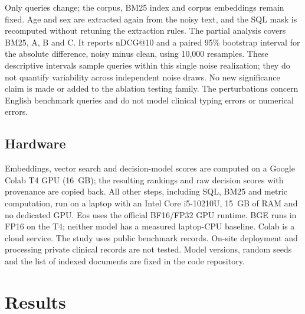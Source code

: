 \documentclass{article}
\begin{document}
Only queries change; the corpus, BM25 index and corpus embeddings remain fixed. Age and sex are extracted again from the noisy text, and the SQL mask is recomputed without retuning the extraction rules. The partial analysis covers BM25, A, B and C. It reports nDCG@10 and a paired 95\% bootstrap interval for the absolute difference, noisy minus clean, using 10{,}000 resamples. These descriptive intervals sample queries within this single noise realization; they do not quantify variability across independent noise draws. No new significance claim is made or added to the ablation testing family. The perturbations concern English benchmark queries and do not model clinical typing errors or numerical errors.

\subsection{Hardware}

Embeddings, vector search and decision-model scores are computed on a Google Colab T4 GPU (16~GB); the resulting rankings and raw decision scores with provenance are copied back. All other steps, including SQL, BM25 and metric computation, run on a laptop with an Intel Core i5-10210U, 15~GB of RAM and no dedicated GPU. Eos uses the official BF16/FP32 GPU runtime. BGE runs in FP16 on the T4; neither model has a measured laptop-CPU baseline. Colab is a cloud service. The study uses public benchmark records. On-site deployment and processing private clinical records are not tested. Model versions, random seeds and the list of indexed documents are fixed in the code repository.

\section{Results}
\label{sec:results}
\end{document}
